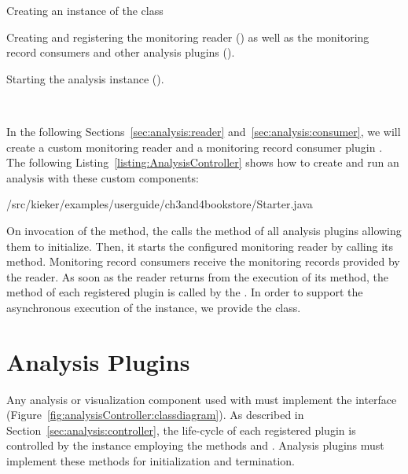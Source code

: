 \enlargethispage{1cm}

\begin{compactenum}
\item Creating an instance of the  class
\item Creating and registering the monitoring reader () as %
well as the monitoring record consumers and other analysis plugins ().
\item Starting the analysis instance ().
\end{compactenum}

\

\noindent In the following Sections~\ref{sec:analysis:reader} and~\ref{sec:analysis:consumer}, %
we will create a custom monitoring reader  and a %
monitoring record consumer plugin . %
\noindent The following Listing~\ref{listing:AnalysisController} shows how to create and run an analysis %
with these custom components:

\setJavaCodeListing
%
{\customComponentsBookstoreApplicationDir/src/kieker/examples/userguide/ch3and4bookstore/Starter.java}

\enlargethispage{1.2cm}

\noindent On invocation of the  method, the  %
calls the  method of all analysis plugins allowing them to initialize. %
Then, it starts the configured monitoring reader by calling its  %
method. Monitoring record consumers receive the monitoring records provided by %
the reader. As soon as the reader returns from the execution of its  
method, the method  of each registered plugin is called by the %
. %
In order to support the asynchronous execution of the  instance, %
we provide the  class.

\section{Analysis Plugins}\label{sec:analysis:plugins}

Any analysis or visualization component used with \KiekerAnalysisPart{} must %
implement the interface  (Figure~\ref{fig:analysisController:classdiagram}). %
As described in Section~\ref{sec:analysis:controller}, the life-cycle of each %
registered plugin is controlled by the  instance %
employing the methods  and . Analysis plugins %
must implement these methods for initialization and termination.

